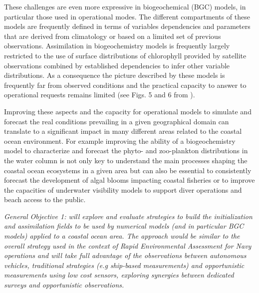These challenges are even more expressive in biogeochemical (BGC)
models, in particular those used in operational modes. The different
compartments of these models are frequently defined in terms of
variables dependencies and parameters that are derived from
climatology or based on a limited set of previous
observations. Assimilation in biogeochemistry models is frequently
largely restricted to the use of surface distributions of chlorophyll
provided by satellite observations combined by established
dependencies to infer other variable distributions. As a consequence
the picture described by these models is frequently far from observed
conditions and the practical capacity to answer to operational
requests remains limited (see Figs. 5 and 6 from \cite{marta012}).
 
Improving these aspects and the capacity for operational models to
simulate and forecast the real conditions prevailing in a given
geographical domain can translate to a significant impact in many
different areas related to the coastal ocean environment. For example
improving the ability of a biogeochemistry model to characterize and
forecast the phyto- and zoo-plankton distributions in the water column
is not only key to understand the main processes shaping the coastal
ocean ecosystems in a given area but can also be essential to
consistently forecast the development of algal blooms impacting
coastal fisheries or to improve the capacities of underwater
visibility models to support diver operations and beach access to the
public.
 
\emph{General Objective 1: \proj will explore and evaluate strategies
  to build the initialization and assimilation fields to be used by
  numerical models (and in particular BGC models) applied to a coastal
  ocean area. The approach would be similar to the overall strategy
  used in the context of Rapid Environmental Assessment for Navy
  operations and will take full advantage of the observations between
  autonomous vehicles, traditional strategies (e.g ship-based
  measurements) and opportunistic measurements using low cost sensors,
  exploring synergies between dedicated surveys and opportunistic
  observations.}
 
